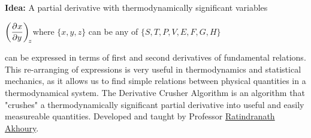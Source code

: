 \documentclass{article}
\date{Winter 2022}
\author{\small Typed in \LaTeX\ by \EC}
\def\Akhoury{\hyperlink{https://lsa.umich.edu/physics/people/faculty/akhoury.html}{Ratindranath Akhoury}}
\begin{document}
\maketitle\thispagestyle{fancy}
\noindent\textbf{Idea:} A partial derivative with thermodynamically significant variables
    \begin{center}
        $\displaystyle\pder{x}{y}[z]$ where $\{x,y,z\}$ can be any of $\{S,T,P,V,E,F,G,H\}$
    \end{center}
    can be expressed in terms of first and second derivatives of fundamental relations. This re-arranging of expressions is very useful in thermodynamics and statistical mechanics, as it allows us to find simple relations between physical quantities in a thermodynamical system. The 
    Derivative Crusher Algorithm is an algorithm that "crushes" a thermodynamically significant partial derivative into useful and easily measureable quantities. Developed and taught by Professor \Akhoury.
\end{document}
